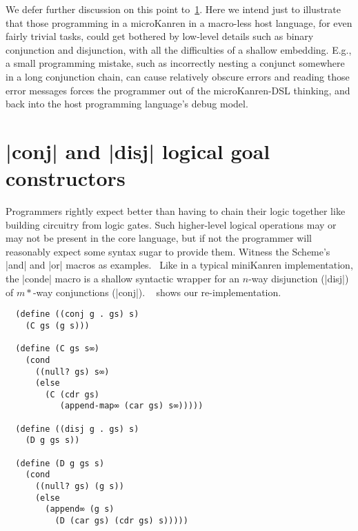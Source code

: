 \documentclass[sigplan,screen,draft,anonymous,review,natbib=false]{acmart}
\begin{document}
We defer further discussion on this point to~\cref{sec:conde}. Here we
intend just to illustrate that those programming in a microKanren in a
macro-less host language, for even fairly trivial tasks, could get
bothered by low-level details such as binary conjunction and
disjunction, with all the difficulties of a shallow embedding. E.g., a
small programming mistake, such as incorrectly nesting a conjunct
somewhere in a long conjunction chain, can cause relatively obscure
errors and reading those error messages forces the programmer out of
the microKanren-DSL thinking, and back into the host programming
language's debug model.

\section{\rackinline|conj| and \rackinline|disj| logical goal
  constructors}\label{sec:conde}

Programmers rightly expect better than having to chain their logic
together like building circuitry from logic gates. Such higher-level
logical operations may or may not be present in the core language, but
if not the programmer will reasonably expect some syntax sugar to
provide them. Witness the Scheme's \rackinline|and| and
\rackinline|or| macros as examples.~\cite{shinn2013revisedreport} Like
in a typical miniKanren implementation, the \rackinline|conde| macro
is a shallow syntactic wrapper for an $n$-way disjunction
(\rackinline|disj|) of $m*$-way conjunctions (\rackinline|conj|).
~ shows our
re-implementation.


\begin{listing}
  \begin{verbatim}
  (define ((conj g . gs) s)
    (C gs (g s)))

  (define (C gs s∞)
    (cond
      ((null? gs) s∞)
      (else
        (C (cdr gs)
           (append-map∞ (car gs) s∞)))))

  (define ((disj g . gs) s)
    (D g gs s))

  (define (D g gs s)
    (cond
      ((null? gs) (g s))
      (else
        (append∞ (g s)
          (D (car gs) (cdr gs) s)))))
  \end{verbatim}
  \caption{Re-implementations of \rackinline|conj| and \rackinline|disj|.}
  \label{mnt:conj-and-disj-reimplementation}
\end{listing}
\end{document}
